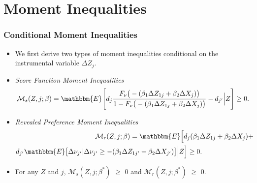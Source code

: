 \section{Moment Inequalities}
\begin{frame}
\frametitle{Conditional Moment Inequalities}

\begin{itemize}
	\item We first derive two types of moment inequalities conditional on the instrumental variable $\Delta Z_{j}$.
	\item \textit{Score Function Moment Inequalities}
	\begin{align*}
	\mathcal{M}_{s}(Z,j;\beta)=\mathbbm{E}\Bigg[d_{j}\frac{F_{\nu}\big(-(\beta_{1}\Delta Z_{1j}+\beta_{2}\Delta X_{j})\big)}{1-F_{\nu}\big(-(\beta_{1}\Delta Z_{1j}+\beta_{2}\Delta X_{j})\big)}-d_{j'}\Big|Z\Bigg]\geq 0.
	\end{align*}
	\item \textit{Revealed Preference Moment Inequalities}
          \begin{align*}
	&\hspace{1.6in}\mathcal{M}_{r}(Z,j;\beta)=\mathbbm{E}\Big[d_{j}(\beta_{1}\Delta Z_{1j}+\beta_{2}\Delta X_{j})+\nonumber\\
	&d_{j'}\mathbbm{E}\big[\Delta\nu_{j'}|\Delta\nu_{j'}\geq-(\beta_{1}\Delta Z_{1j'}+\beta_{2}\Delta X_{j'})\big]\Big|Z\Big]\geq 0.
	\end{align*}
	\item For any $Z$ and $j$, $\mathcal{M}_{s}(Z,j;\beta^{*})$ $\geq$ $0$ and $\mathcal{M}_{r}(Z,j;\beta^{*})$ $\geq$ $0$.

\end{itemize}
\end{frame}
